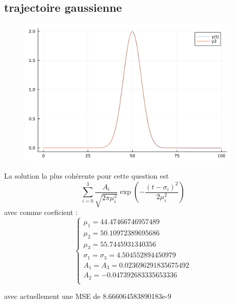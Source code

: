\documentclass[11pt,a4paper]{article}
\newcommand{\gaussian}[3]{\dfrac{#1}{\sqrt{2\pi #3^2}} \exp\left(-\dfrac{(t - #2)^2}{2#3^2}\right)}
\begin{document}
\subsection{trajectoire gaussienne}
\begin{figure}[!h]
  \begin{center}
    \includegraphics[width=0.95\textwidth]{../code/jlplots/Q1_8.pdf}
  \end{center}
  \caption{}\label{fig:Q1_8_gaussian}
\end{figure}
La solution la plus cohérente pour cette question est
$$\displaystyle\sum_{i=0}^{3}{\gaussian{A_i}{\sigma_i}{\mu_i}}$$
avec comme coeficient :
\begin{equation}
  \begin{cases}
    \mu_1= 44.47466746957489 \\
    \mu_2=50.10972389695686 \\
    \mu_3=55.7445931340356 \\
    \sigma_1=\sigma_3=4.504552894450979 \\
    A_1=A_3=0.023696291835675492 \\
    A_2=-0.047392683335653336 \\

  \end{cases}
  \label{eq:}
\end{equation}

avec actuellement une MSE de 8.666064583890183e-9
 
\end{document}
